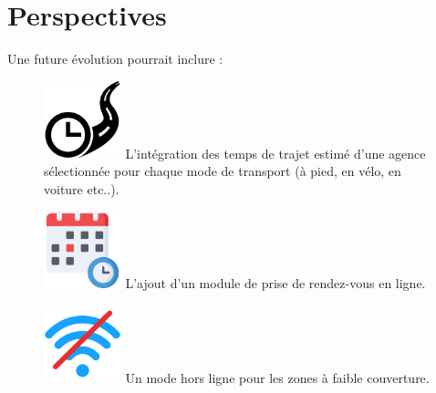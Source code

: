 \documentclass[12pt,a4paper]{report}
\begin{document}
\section{Perspectives}
Une future évolution pourrait inclure :

\vspace{1cm}
\begin{figure}[h] %
    \centering
    \includegraphics[width=0.2\textwidth]{ressources_rapport/temps_trajet.png}
    L’intégration des temps de trajet estimé d'une agence sélectionnée pour chaque mode de transport (à pied, en vélo, en voiture etc..).
\end{figure}

\vspace{1cm}
\begin{figure}[h] %
    \centering
    \includegraphics[width=0.2\textwidth]{ressources_rapport/rdv.png}
    L’ajout d’un module de prise de rendez-vous en ligne.
\end{figure}

\vspace{1cm}
\begin{figure}[h] %
    \centering
    \includegraphics[width=0.2\textwidth]{ressources_rapport/offline.png}
    Un mode hors ligne pour les zones à faible couverture.
\end{figure}

\end{document}

